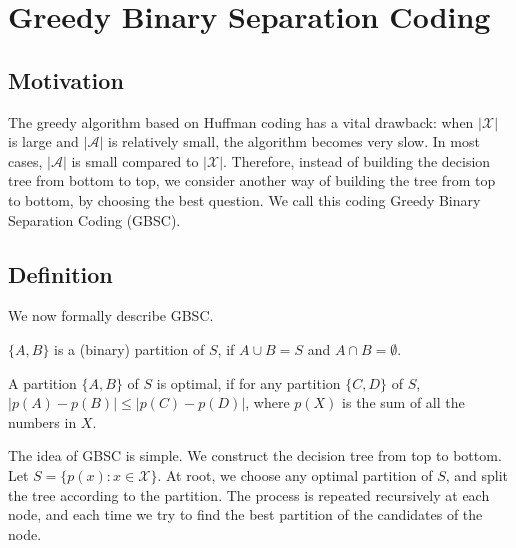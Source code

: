 
\section{Greedy Binary Separation Coding}
\label{sec:gbsc}

\subsection{Motivation}

The greedy algorithm based on Huffman coding has a vital drawback: when $|\mathcal{X}|$ is large and $|\mathscr{A}|$ is relatively small, the algorithm becomes very slow. In most cases, $|\mathscr{A}|$ is small compared to $|\mathcal{X}|$. Therefore, instead of building the decision tree from bottom to top, we consider another way of building the tree from top to bottom, by choosing the best question. We call this coding Greedy Binary Separation Coding (GBSC).

\subsection{Definition}

We now formally describe GBSC.

\begin{definition}
$\{A, B\}$ is a (binary) partition of $S$, if $A \cup B = S$ and $A \cap B = \emptyset$.
\end{definition}

\begin{definition}
A partition $\{A,B\}$ of $S$ is optimal, if for any partition $\{C,D\}$ of $S$, $|p(A) - p(B)| \le |p(C) - p(D)|$, where $p(X)$ is the sum of all the numbers in $X$.
\end{definition}

The idea of GBSC is simple. We construct the decision tree from top to bottom. Let $S=\{p(x): x \in \mathcal{X} \}$. At root, we choose any optimal partition of $S$, and split the tree according to the partition. The process is repeated recursively at each node, and each time we try to find the best partition of the candidates of the node.

